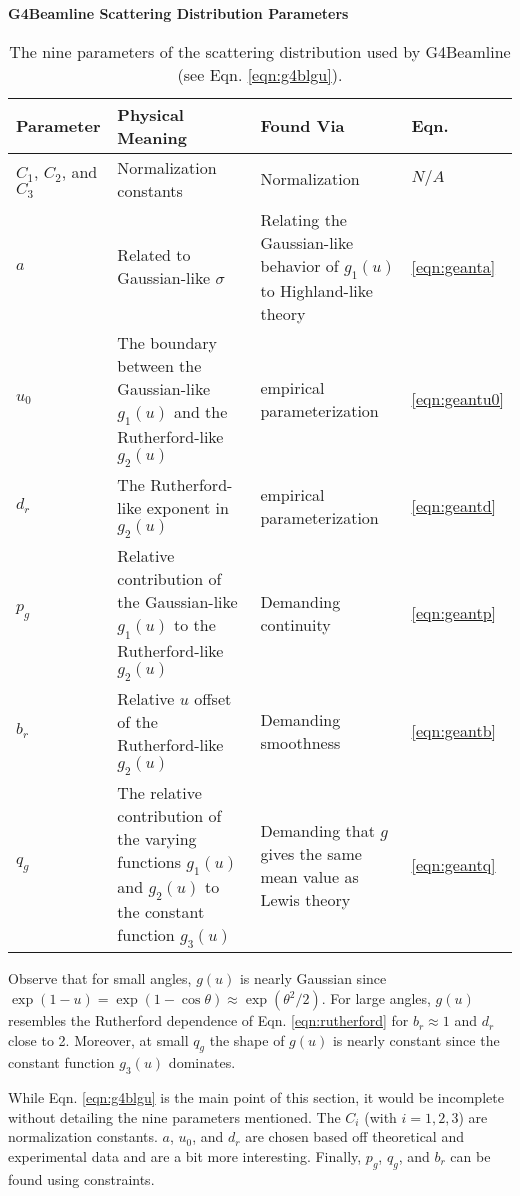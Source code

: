\begin{table}
\caption*{\textbf{G4Beamline Scattering Distribution Parameters}}
\begin{tabularx}{\textwidth}{| A | B | B | C |}
\hline \hline
	\textbf{Parameter} & \textbf{Physical Meaning} & \textbf{Found Via} & \textbf{Eqn.} \\ \hline
	$C_1$, $C_2$, and $C_3$ & Normalization constants & Normalization & $N/A$ \\ \hline
	$a$ & Related to Gaussian-like $\sigma$ & Relating the Gaussian-like behavior of $g_1(u)$ to Highland-like theory \cite{highland} & \ref{eqn:geanta} \\ \hline
	$u_0$ & The boundary between the Gaussian-like $g_1(u)$ and the Rutherford-like $g_2(u)$ & empirical parameterization & \ref{eqn:geantu0} \\ \hline
	$d_r$ & The Rutherford-like exponent in $g_2(u)$ & empirical parameterization & \ref{eqn:geantd} \\ \hline
	$p_g$ & Relative contribution of the Gaussian-like $g_1(u)$ to the Rutherford-like $g_2(u)$ & Demanding continuity & \ref{eqn:geantp} \\ \hline
	$b_r$ & Relative $u$ offset of the Rutherford-like $g_2(u)$ & Demanding smoothness & \ref{eqn:geantb} \\ \hline
	$q_g$ & The relative contribution of the varying functions $g_1(u)$ and $g_2(u)$ to the constant function $g_3(u)$ & Demanding that $g$ gives the same mean value as Lewis theory & \ref{eqn:geantq}\\
\hline
\end{tabularx}
\caption[G4Beamline scattering distribution parameters.]{The nine parameters of the scattering distribution used by G4Beamline (see Eqn. \ref{eqn:g4blgu}).}
\label{tbl:g4blgu_parameters}
\end{table}


Observe that for small angles, $g(u)$ is nearly Gaussian since $\exp{(1-u)}=\exp{(1-\cos\theta)}\approx\exp{(\theta^2/2)}$. For large angles, $g(u)$ resembles the Rutherford dependence of Eqn. \ref{eqn:rutherford} for $b_r\approx 1$ and $d_r$ close to 2. Moreover, at small $q_g$ the shape of $g(u)$ is nearly constant since the constant function $g_3(u)$ dominates.

While Eqn. \ref{eqn:g4blgu} is the main point of this section, it would be incomplete without detailing the nine parameters mentioned. The $C_i$ (with $i=1,2,3$) are normalization constants. $a$, $u_0$, and $d_r$ are chosen based off theoretical and experimental data and are a bit more interesting. Finally, $p_g$, $q_g$, and $b_r$ can be found using constraints. 

